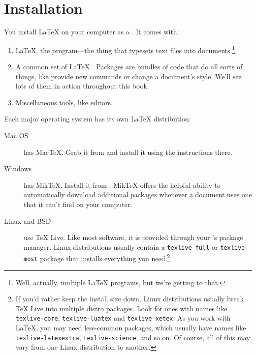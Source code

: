 \chapter{Installation}
\label{installation}

You install \LaTeX{} on your computer as a .
It comes with:
\begin{enumerate}
\item \LaTeX, the program---the thing that typesets text files into
    documents.\footnote{Well, actually, multiple \LaTeX{} programs,
    but we're getting to that.}
\item A common set of \LaTeX{} .
    Packages are bundles of code that do all sorts of things,
    like provide new commands or change a document's style.
    We'll see lots of them in action throughout this book.
\item Miscellaneous tools, like editors.
\end{enumerate}
Each major operating system has its own \LaTeX{} distribution:
\begin{description}
\item[Mac OS] has Mac\TeX. Grab it from 
    and install it using the instructions there.

\item[Windows] has Mik\TeX.
    Install it from .
    Mik\TeX{} offers the helpful ability to automatically download
    additional packages whenever a document uses one that it can't find
    on your computer.

\item[Linux and BSD] use \TeX{} Live.
    Like most software, it is provided through your
    's package manager.
    Linux distributions usually contain a \texttt{texlive-\allowbreak full}
    or \texttt{texlive-\allowbreak most} package that installs everything
    you need.\punckern\footnote{%
    If you'd rather keep the install size down,
    Linux distributions usually break \TeX{} Live into multiple distro packages.
    Look for ones with names like
    \texttt{texlive-\allowbreak core}, \texttt{texlive-\allowbreak luatex}
    and \texttt{texlive-\allowbreak xetex}.
    As you work with \LaTeX, you may need less-common packages,
    which usually have names like \texttt{texlive-\allowbreak latexextra},
    \texttt{texlive-\allowbreak science}, and so on.
    Of course, all of this may vary from one Linux distribution to another.}
\end{description}

